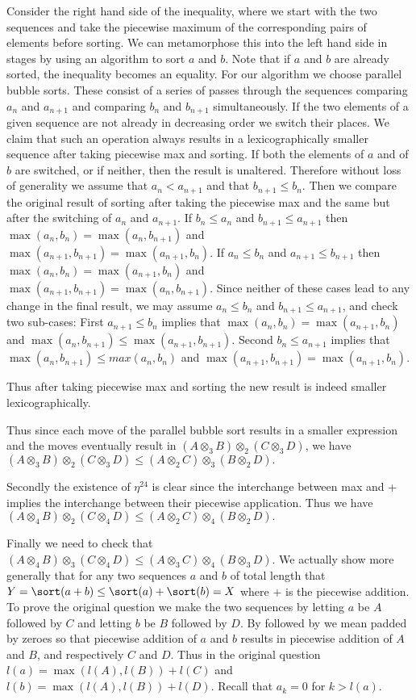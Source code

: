 \documentclass{tac}
\begin{document}
{\begin{enumerate}
Consider the right hand side of the inequality, where we start with the two sequences and take the 
piecewise maximum of the corresponding pairs of elements before sorting. We can metamorphose this
into the left hand side in stages by using an algorithm to sort $a$ and $b$. Note that if $a$ and $b$ are
already sorted, the inequality becomes an equality.
For our algorithm we choose parallel bubble sorts. These consist
of a series of passes through the sequences comparing $a_n$ and $a_{n+1}$ and  comparing $b_n$ and $b_{n+1}$
simultaneously. If the two elements of a given sequence are not already in decreasing order we 
switch their places. We claim that such an operation always results in a lexicographically smaller
sequence after taking piecewise max and sorting. If both the elements of $a$ and of $b$ are switched, or if neither,
then the result is unaltered. Therefore without loss of generality we assume that $a_n < a_{n+1}$
and that $b_{n+1} \le b_n.$ Then we compare the original
result of sorting after taking the piecewise max and the same but after the switching of $a_n$ and
$a_{n+1}.$ If $b_n \le a_n$ and $b_{n+1} \le a_{n+1}$ then 
$\max(a_n,b_n) = \max(a_n, b_{n+1})$ and $\max(a_{n+1}, b_{n+1}) = \max(a_{n+1}, b_n).$ If $a_n \le b_n$ 
and $a_{n+1} \le b_{n+1}$  then
$\max(a_n,b_n) = \max(a_{n+1}, b_n)$ and $\max(a_{n+1}, b_{n+1}) = \max(a_n, b_{n+1}).$
 Since neither of these cases lead to any change in the final result,
 we may assume $a_n \le b_n$ and $b_{n+1} \le a_{n+1}$, and check two sub-cases:
First $a_{n+1} \le b_n$ implies that
$\max(a_n,b_n) = \max(a_{n+1}, b_n)$ and $\max(a_n, b_{n+1}) \le \max(a_{n+1}, b_{n+1}).$ Second $b_n \le a_{n+1}$
implies that $\max(a_n, b_{n+1}) \le max(a_n,b_n)$ and $\max(a_{n+1}, b_{n+1}) = \max(a_{n+1}, b_n).$ 

Thus after taking piecewise max
and sorting the new result is indeed smaller lexicographically. 

Thus since each move of the parallel bubble sort results in a smaller expression  and the moves
eventually result in $(A \otimes_3 B)\otimes_2(C \otimes_3 D)$, we have $(A \otimes_3 B)\otimes_2(C \otimes_3 D) \le (A \otimes_2 C)\otimes_3 (B \otimes_2 D).$  
  
Secondly the existence of $\eta^{24}$ is clear since the interchange between max and + implies the interchange between 
their piecewise application. Thus we have $(A \otimes_4 B)\otimes_2(C \otimes_4 D) \le (A \otimes_2 C)\otimes_4 (B \otimes_2 D).$
      
   
Finally we need to check that $(A \otimes_4 B)\otimes_3(C \otimes_4 D) \le(A \otimes_3 C)\otimes_4 (B \otimes_3 D).$  
We actually show more generally that for any two sequences $a$ and $b$ of total length
that $Y= \sort(a+b)\le \sort(a)+\sort(b) =X$ where $+$ is the piecewise addition.
To prove the original question we make the two sequences by letting $a$ be $A$ followed by 
$C$ and letting $b$ be $B$ followed by $D$. By followed by we mean padded by zeroes so that
piecewise addition of $a$ and $b$ results in piecewise addition of $A$ and $B$, and respectively $C$ and $D.$
Thus in the original question $l(a) = \max(l(A),l(B)) + l(C) $ and $l(b) = \max(l(A),l(B)) + l(D).$
Recall that $a_k = 0$ for $k>l(a)$.


\end{enumerate}}
\end{document}
